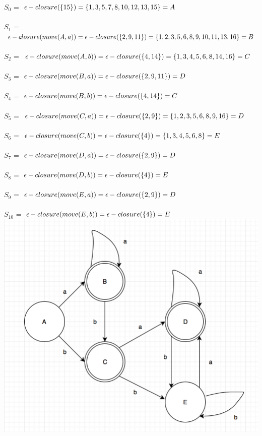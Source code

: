 \documentclass[12pt, A4]{article}
\begin{document}
	$S_0$ = $\epsilon-closure(\{15\}) \\= \{1, 3, 5, 7, 8, 10, 12, 13, 15\} = A$\\ \\
	$S_1$ = $\epsilon-closure(move(A, a)) \\= \epsilon-closure(\{2, 9, 11\}) \\= \{1, 2, 3, 5, 6, 8, 9, 10, 11, 13, 16\} = B$\\ \\
	$S_2$ = $\epsilon-closure(move(A, b)) \\= \epsilon-closure(\{4, 14\}) \\= \{1, 3, 4, 5, 6, 8, 14, 16\} = C$\\ \\
	$S_3$ = $\epsilon-closure(move(B, a)) \\= \epsilon-closure(\{2, 9, 11\}) = D$\\ \\
	$S_4$ = $\epsilon-closure(move(B, b)) \\= \epsilon-closure(\{4, 14\}) = C$\\ \\
	$S_5$ = $\epsilon-closure(move(C, a)) \\= \epsilon-closure(\{2, 9\}) \\= \{1, 2, 3, 5, 6, 8, 9, 16\} = D$\\ \\
	$S_6$ = $\epsilon-closure(move(C, b)) \\= \epsilon-closure(\{4\}) \\= \{1, 3, 4, 5, 6, 8\} = E$\\ \\
	$S_7$ = $\epsilon-closure(move(D, a)) \\= \epsilon-closure(\{2, 9\}) = D$\\ \\
	$S_8$ = $\epsilon-closure(move(D, b)) \\= \epsilon-closure(\{4\}) = E$\\ \\
	$S_9$ = $\epsilon-closure(move(E, a)) \\= \epsilon-closure(\{2, 9\}) = D$\\ \\
	$S_{10}$ = $\epsilon-closure(move(E, b)) \\= \epsilon-closure(\{4\}) = E$\\
	
	\includegraphics[scale=0.8]{Question3}
	
\end{document}
